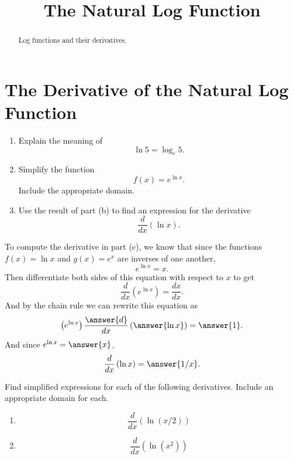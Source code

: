 \documentclass{ximera}
\title{The Natural Log Function}
\begin{document}
\begin{abstract}
Log functions and their derivatives.
\end{abstract}
\maketitle


\section{The Derivative of the Natural Log Function}
\begin{question} \label{Qdfggghghhfll}

\begin{enumerate}
\item Explain the meaning of 
\[
  \ln 5 = \log_e 5 .
\]

\item Simplify the function
\[
     f(x) = e^{\ln x} .
\]
Include the appropriate domain.

\item Use the result of part (b) to find an expression for the derivative
\[
 \frac{d}{dx} \left(  \ln x \right ) .
\]
\end{enumerate}

\begin{expandable}
To compute the derivative in part (c), we know that since the functions $f(x)=\ln x$ and $g(x)=e^x$ are inverses of one another,
\[
    e^{\ln x} = x .
\]
Then differentiate both sides of this equation with respect to $x$ to get
\[
        \frac{d}{dx} \left(  e^{\ln x} \right) = \frac{dx}{dx} .
\]
And by the chain rule we can rewrite this equation as
\[
         \left(  e^{\ln x} \right)   \frac{\answer{d}}{dx} \left(  \answer{\ln x} \right) = \answer{1} . 
\]
And since $e^{\ln x} = \answer{x}$, 
\[
         \frac{d}{dx} \left(  \ln x  \right) = \answer{1/x}.
\]
\end{expandable}

\end{question}

\begin{question} \label{Qhhghgfgfdgghhfll}
Find simplified expressions for each of the following derivatives. Include an appropriate domain for each.

\begin{enumerate}
\item 
\[
   \frac{d}{dx} \left( \ln \left( x/2 \right) \right)
\]

\item 
\[
\frac{d}{dx} \left( \ln \left( x^2 \right) \right)
\]
\end{enumerate}

\end{question}
\end{document}

